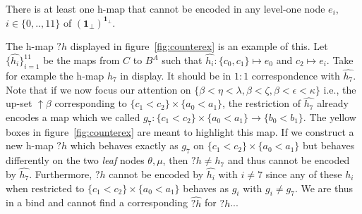  \begin{lem}
 	There is at least one h-map that cannot be encoded in any level-one node $e_i$, $i \in \{0,..,11\}$ of $(\textbf{1}_\bot)^{\textbf{1}_\bot}$.
 \end{lem}
 The h-map $?h$ displayed in figure~\ref{fig:counterex} is an example of this.
  \newline
Let $\{\hat{h_i}\}_{i=1}^{11}$ be the maps from $C$ to $B^A$ such that $\hat{h_i}: \{c_0,c_1\}\mapsto e_0$ and $c_2 \mapsto e_i$. 
\newline
Take for example the h-map $h_7$ in display.
\newline
It should be in $1:1$ correspondence with $\hat{h_7}$.\newline 
Note that if we now focus our attention on $\{\beta < \eta < \lambda, \beta < \zeta,  \beta < \epsilon < \kappa\}$ i.e., the up-set $\uparrow \beta$ corresponding to $\{c_1 < c_2\} \times \{a_0 < a_1\}  $, the restriction of $\hat{h_7}$ already encodes a map which we called $g_7 :  \{c_1 < c_2\} \times \{a_0 < a_1\} \rightarrow \{b_0 < b_1\}$. \newline 
The yellow boxes in figure~\ref{fig:counterex} are meant to highlight this map. \newline	
If we construct a new h-map $?h$ which behaves exactly as $g_7$ on $\{c_1 < c_2\} \times \{a_0 < a_1\}$ but behaves differently on the two \emph{leaf} nodes $\theta, \mu$, then $?h \neq h_7$ and thus cannot be encoded by $\hat{h_7}$. \newline
Furthermore, $?h$ cannot be encoded by $\hat{h_i}$ with $i \neq 7$ since any of these $h_i$ when restricted to $\{c_1 < c_2\} \times \{a_0 < a_1\}$ behaves as $g_i$ with $g_i \neq g_7$.
\newline\newline
 We are thus in a bind and cannot find a corresponding $\hat{?h}$ for $?h$...
